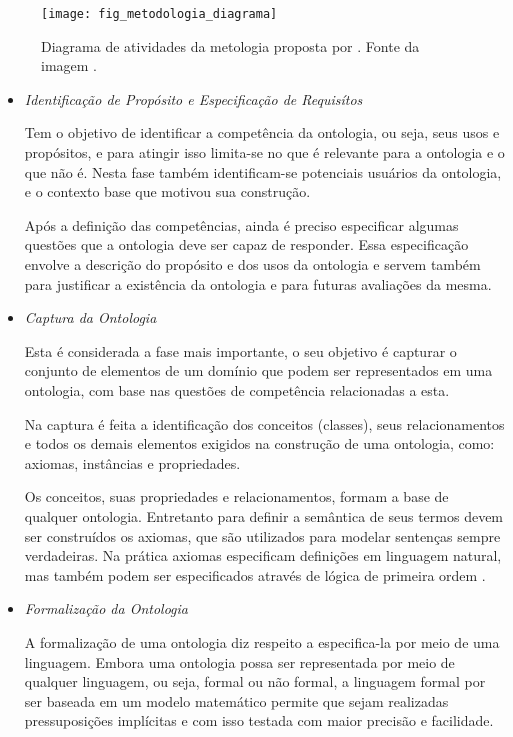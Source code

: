 \begin{figure}[!h]
  \centering
  \texttt{[image: fig\_metodologia\_diagrama]} 
  \caption{Diagrama de atividades da metologia proposta por 
    \cite{guizzardidesenvolvimento}. Fonte da imagem \cite{morais2007ontologias}. 
  }
  \label{fig:diagrama_metodologia} 
\end{figure}

\begin{itemize}
    \item \textit{Identificação de Propósito e Especificação de Requisítos}
    
    Tem o objetivo de identificar a competência da ontologia, ou seja, seus usos
    e propósitos, e para atingir isso limita-se no que é relevante para a ontologia
    e o que não é. Nesta fase também identificam-se potenciais usuários da ontologia,
    e o contexto base que motivou sua construção.
    
    Após a definição das competências, ainda é preciso especificar algumas 
    questões que a ontologia deve ser capaz de responder. Essa especificação 
    envolve a descrição do propósito e dos usos da ontologia e servem também para
    justificar a existência da ontologia e para futuras avaliações da mesma.
    
    \item \textit{Captura da Ontologia}
    
    Esta é considerada a fase mais importante, o seu objetivo é capturar o 
    conjunto de elementos de um domínio que podem ser representados em uma 
    ontologia, com base nas questões de competência relacionadas a esta.
    
    Na captura é feita a identificação dos conceitos (classes), seus 
    relacionamentos e todos os demais elementos exigidos na construção de uma
    ontologia, como: axiomas, instâncias e propriedades.
    
    Os conceitos, suas propriedades e relacionamentos, formam a base de qualquer
    ontologia. Entretanto para definir a semântica de seus termos devem ser 
    construídos os axiomas, que são utilizados para modelar sentenças sempre
    verdadeiras. Na prática axiomas especificam definições em linguagem natural,
    mas também podem ser especificados através de lógica de primeira ordem 
    \cite{falbo1998integracao}.
    
    \item \textit{Formalização da Ontologia}
    
    A formalização de uma ontologia diz respeito a especifica-la por meio de uma
    linguagem. Embora uma ontologia possa ser representada por meio de qualquer 
    linguagem, ou seja, formal ou não formal, a linguagem formal por ser baseada
    em um modelo matemático permite que sejam realizadas pressuposições 
    implícitas e com isso testada com maior precisão e facilidade.
    

\end{itemize}
